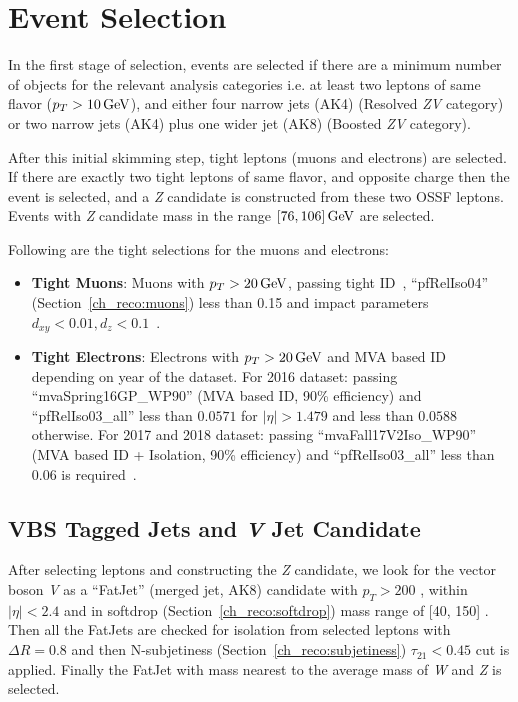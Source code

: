 \clearpage
\section{
  Event Selection
 }\label{ch_vbs:event-selection}

In the first stage of selection, events are selected if there are a minimum number
of objects for the relevant analysis categories i.e.
at least two leptons of same flavor (\( p_T > 10 \,\text{Ge\hspace{-.08em}V}{} \)), and either
four narrow jets (AK4) (Resolved \textit{ZV} category) or two narrow jets (AK4)
plus one wider jet (AK8) (Boosted \textit{ZV} category).

After this initial skimming step, tight leptons (muons and electrons) are
selected. If there are exactly two tight leptons
of same flavor, and opposite charge then the event is selected,
and a \textit{Z} candidate is constructed from these two \gls{OSSF} leptons.
Events with \textit{Z} candidate mass in the range \( [76, 106] \,\text{Ge\hspace{-.08em}V}{} \) are selected.

Following are the tight selections for the muons and electrons:
\begin{itemize}
  \item \textbf{Tight Muons}: Muons with \( p_T > 20 \,\text{Ge\hspace{-.08em}V}{} \), passing
        tight ID~\cite{cms-muon-id}, ``pfRelIso04'' (Section~\ref{ch_reco:muons}) less than 0.15 and
        impact parameters \( d_{xy} < 0.01, d_z < 0.1 \)~\cite{cms-muon-id}.
  \item \textbf{Tight Electrons}: Electrons with \( p_T > 20 \,\text{Ge\hspace{-.08em}V} \)
        and MVA based ID depending on year of the dataset.
        For 2016 dataset: passing ``mvaSpring16GP\_WP90'' (MVA based ID, 90\% efficiency)
        and ``pfRelIso03\_all'' less than \( 0.0571 \) for
        \( |\eta| > 1.479 \) and less than \( 0.0588 \) otherwise.
        For 2017 and 2018 dataset: passing ``mvaFall17V2Iso\_WP90''
        (MVA based ID + Isolation, 90\% efficiency) and ``pfRelIso03\_all''
        less than \( 0.06 \) is required~\cite{cms-egamma-id}.
\end{itemize}

\subsection{
  VBS Tagged Jets and \textit{V} Jet Candidate
}
After selecting leptons and constructing the \textit{Z} candidate, we look
for the vector boson \textit{V} as a ``FatJet'' (merged jet, AK8) candidate with \( p_T > 200 \) \GeV{},
within \( |\eta| < 2.4 \) and in softdrop (Section~\ref{ch_reco:softdrop}) mass range of [40, 150] \GeV{}.
Then all the FatJets are checked for isolation from
selected leptons with \( \Delta R = 0.8 \)
and then N-subjetiness (Section~\ref{ch_reco:subjetiness}) \( \tau_{21} < 0.45 \) cut is applied.
Finally the FatJet with mass nearest to the average mass of \textit{W} and \textit{Z}
is selected.

